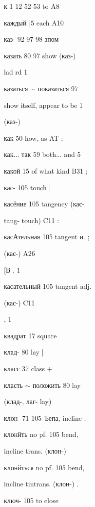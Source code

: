 \begin{minipage}[t]{0.475\textwidth}
\raggedright
{}\par
{}\par
\noindent к 1 12 52 53 to A8\par
{}\par
\noindent каждый |5 each A10\par
{}\par
\noindent каз- 92 97-98 зпом\par
\noindent *казать 80 97 show (каз-)\par
\noindent lad rd 1\par
\noindent казаться $\sim$ показаться 97\par
\noindent show itself, appear to be 1\par
\noindent (каз-)\par
\noindent как 50 how, as AT ;\par
\noindent как... так 59 both... and 5\par
\noindent какой 15 of what kind B31 ;\par
\noindent кас- 105 touch |\par
\noindent касёние 105 tangency (кас-\par
\noindent tang- touch) C11 :\par
\noindent касАтельная 105 tangent и. ;\par
\noindent (кас-) A26\par
{} [В . 1\par
\noindent касательный 105 tangent adj.\par
\noindent (кас-) C11\par
\noindent , 1\par
\noindent квадрат 17 square\par
\noindent клад- 80 lay |\par
\noindent класс 37 class +\par
\noindent класть $\sim$ положить 80 lay\par
\noindent (клад-, лаг- lay)\par
\noindent клон- 71 105 Ъепа, incline ;\par
\noindent клонйть no pf. 105 bend,\par
\noindent incline trans. (клон-)\par
\noindent клонйться no pf. 105 bend,\par
\noindent incline tintrans. (клон-) .\par
\noindent ключ- 105 to close\par

\end{minipage}
